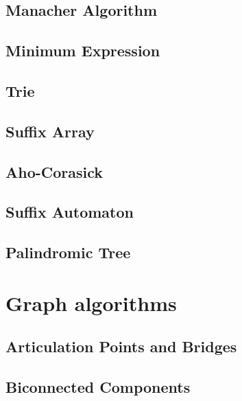\subsection{Manacher Algorithm}
\raggedbottom
\hrulefill
\subsection{Minimum Expression}
\raggedbottom
\hrulefill
\subsection{Trie}
\raggedbottom
\hrulefill
\subsection{Suffix Array}
\raggedbottom
\hrulefill
\subsection{Aho-Corasick}
\raggedbottom
\hrulefill
\subsection{Suffix Automaton}
\raggedbottom
\hrulefill
\subsection{Palindromic Tree}
\raggedbottom
\hrulefill

\section{Graph algorithms}
\subsection{Articulation Points and Bridges}
\raggedbottom
\hrulefill
\subsection{Biconnected Components}
\raggedbottom
\hrulefill
